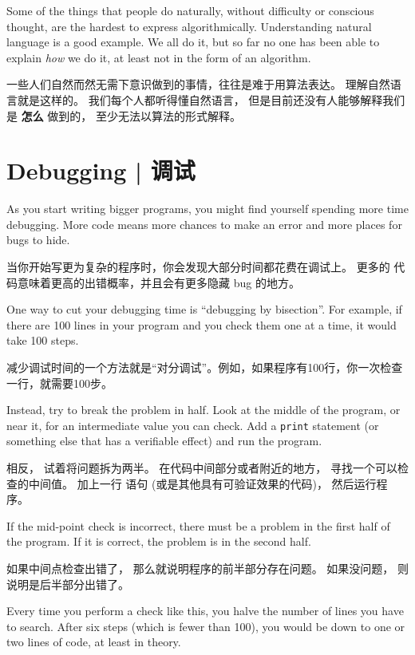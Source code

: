 Some of the things that people do naturally, without difficulty or
conscious thought, are the hardest to express algorithmically.
Understanding natural language is a good example.  We all do it, but
so far no one has been able to explain {\em how} we do it, at least
not in the form of an algorithm.

一些人们自然而然无需下意识做到的事情，往往是难于用算法表达。 理解自然语言就是这样的。 我们每个人都听得懂自然语言， 但是目前还没有人能够解释我们是 {\bf 怎么} 做到的， 至少无法以算法的形式解释。

\section{Debugging  |  调试}
\label{bisectbug}

As you start writing bigger programs, you might find yourself
spending more time debugging.  More code means more chances to
make an error and more places for bugs to hide.
  

当你开始写更为复杂的程序时，你会发现大部分时间都花费在调试上。 更多的
代码意味着更高的出错概率，并且会有更多隐藏 bug 的地方。
  

One way to cut your debugging time is ``debugging by bisection''.
For example, if there are 100 lines in your program and you
check them one at a time, it would take 100 steps.

减少调试时间的一个方法就是“对分调试”。例如，如果程序有100行，你一次检查一行，就需要100步。

Instead, try to break the problem in half.  Look at the middle
of the program, or near it, for an intermediate value you
can check.  Add a {\tt print} statement (or something else
that has a verifiable effect) and run the program.

相反， 试着将问题拆为两半。 在代码中间部分或者附近的地方， 寻找一个可以检查的中间值。 加上一行  语句 (或是其他具有可验证效果的代码)， 然后运行程序。

If the mid-point check is incorrect, there must be a problem in the
first half of the program.  If it is correct, the problem is
in the second half.

如果中间点检查出错了， 那么就说明程序的前半部分存在问题。 如果没问题， 则说明是后半部分出错了。

Every time you perform a check like this, you halve the number of
lines you have to search.  After six steps (which is fewer than 100),
you would be down to one or two lines of code, at least in theory.

